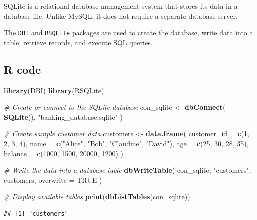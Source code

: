 \documentclass[
]{article}
\newenvironment{Shaded}{\begin{snugshade}}{\end{snugshade}}
\newcommand{\AttributeTok}[1]{\textcolor[rgb]{0.13,0.29,0.53}{#1}}
\newcommand{\CommentTok}[1]{\textcolor[rgb]{0.56,0.35,0.01}{\textit{#1}}}
\newcommand{\ConstantTok}[1]{\textcolor[rgb]{0.56,0.35,0.01}{#1}}
\newcommand{\DecValTok}[1]{\textcolor[rgb]{0.00,0.00,0.81}{#1}}
\newcommand{\FunctionTok}[1]{\textcolor[rgb]{0.13,0.29,0.53}{\textbf{#1}}}
\newcommand{\NormalTok}[1]{#1}
\newcommand{\OtherTok}[1]{\textcolor[rgb]{0.56,0.35,0.01}{#1}}
\newcommand{\StringTok}[1]{\textcolor[rgb]{0.31,0.60,0.02}{#1}}
\begin{document}
SQLite is a relational database management system that stores its data
in a database file. Unlike MySQL, it does not require a separate
database server.

The \texttt{DBI} and \texttt{RSQLite} packages are used to create the
database, write data into a table, retrieve records, and execute SQL
queries.

\subsection{R code}\label{r-code-2}

\begin{Shaded}
\begin{Highlighting}[]
\FunctionTok{library}\NormalTok{(DBI)}
\FunctionTok{library}\NormalTok{(RSQLite)}

\CommentTok{\# Create or connect to the SQLite database}
\NormalTok{con\_sqlite }\OtherTok{\textless{}{-}} \FunctionTok{dbConnect}\NormalTok{(}
  \FunctionTok{SQLite}\NormalTok{(),}
  \StringTok{"banking\_database.sqlite"}
\NormalTok{)}

\CommentTok{\# Create sample customer data}
\NormalTok{customers }\OtherTok{\textless{}{-}} \FunctionTok{data.frame}\NormalTok{(}
  \AttributeTok{customer\_id =} \FunctionTok{c}\NormalTok{(}\DecValTok{1}\NormalTok{, }\DecValTok{2}\NormalTok{, }\DecValTok{3}\NormalTok{, }\DecValTok{4}\NormalTok{),}
  \AttributeTok{name =} \FunctionTok{c}\NormalTok{(}\StringTok{"Alice"}\NormalTok{, }\StringTok{"Bob"}\NormalTok{, }\StringTok{"Claudine"}\NormalTok{, }\StringTok{"David"}\NormalTok{),}
  \AttributeTok{age =} \FunctionTok{c}\NormalTok{(}\DecValTok{25}\NormalTok{, }\DecValTok{30}\NormalTok{, }\DecValTok{28}\NormalTok{, }\DecValTok{35}\NormalTok{),}
  \AttributeTok{balance =} \FunctionTok{c}\NormalTok{(}\DecValTok{1000}\NormalTok{, }\DecValTok{1500}\NormalTok{, }\DecValTok{20000}\NormalTok{, }\DecValTok{1200}\NormalTok{)}
\NormalTok{)}

\CommentTok{\# Write the data into a database table}
\FunctionTok{dbWriteTable}\NormalTok{(}
\NormalTok{  con\_sqlite,}
  \StringTok{"customers"}\NormalTok{,}
\NormalTok{  customers,}
  \AttributeTok{overwrite =} \ConstantTok{TRUE}
\NormalTok{)}

\CommentTok{\# Display available tables}
\FunctionTok{print}\NormalTok{(}\FunctionTok{dbListTables}\NormalTok{(con\_sqlite))}
\end{Highlighting}
\end{Shaded}

\begin{verbatim}
## [1] "customers"
\end{verbatim}
\end{document}
